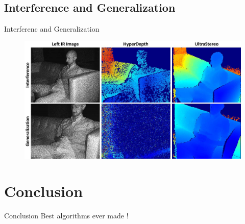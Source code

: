 \subsection{Interference and Generalization}
\begin{frame}{Interferenc and Generalization}
\begin{figure}
\includegraphics[scale=0.08]{pictures/fig8}
\caption{}
\end{figure}
\end{frame}

\section{Conclusion}
\begin{frame}{Conclusion}
Best algorithms ever made !
\end{frame}
